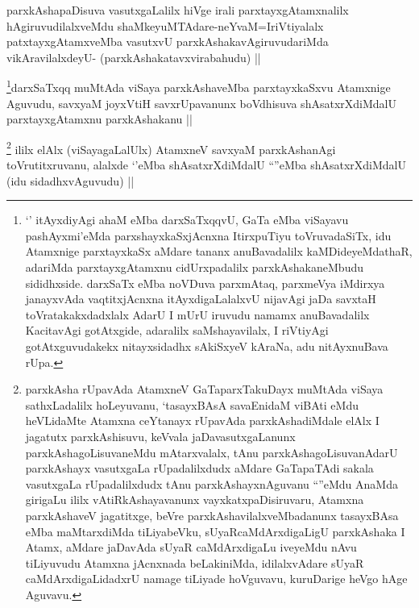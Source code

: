 
\begin{artha}
parxkAshapaDisuva vasutxgaLalilx hiVge irali parxtayxgAtamxnalilx hAgiruvudilalxveMdu shaMkeyuMTAdare-neYvaM=IriVtiyalalx patxtayxgAtamxveMba vasutxvU parxkAshakavAgiruvudariMda vikAravilalxdeyU- (parxkAshakatavxvirabahudu) ||
\end{artha}



\begin{artha}
  \footnote{`\stext' itAyxdiyAgi ahaM eMba darxSaTxqqvU, GaTa eMba viSayavu pashAyxmi'eMda parxshayxkaSxjAcnxna ItirxpuTiyu toVruvadaSiTx, idu Atamxnige parxtayxkaSx aMdare tananx anuBavadalilx kaMDideyeMdathaR, adariMda parxtayxgAtamxnu cidUrxpadalilx parxkAshakaneMbudu sididhxside. darxSaTx eMba noVDuva parxmAtaq, parxmeVya iMdirxya janayxvAda vaqtitxjAcnxna itAyxdigaLalalxvU nijavAgi jaDa savxtaH toVratakakxdadxlalx AdarU I mUrU iruvudu namamx anuBavadalilx KacitavAgi gotAtxgide, adaralilx saMshayavilalx, I riVtiyAgi gotAtxguvudakekx nitayxsidadhx sAkiSxyeV kAraNa, adu nitAyxnuBava rUpa.}darxSaTxqq muMtAda viSaya parxkAshaveMba parxtayxkaSxvu Atamxnige Aguvudu, savxyaM joyxVtiH savxrUpavanunx boVdhisuva shAsatxrXdiMdalU parxtayxgAtamxnu parxkAshakanu ||
\end{artha}


\begin{artha}
\footnote{parxkAsha rUpavAda AtamxneV GaTaparxTakuDayx muMtAda viSaya sathxLadalilx hoLeyuvanu, `tasayxBAsA savaEnidaM viBAti eMdu heVLidaMte Atamxna ceYtanayx rUpavAda parxkAshadiMdale elAlx I jagatutx parxkAshisuvu, keVvala jaDavasutxgaLanunx parxkAshagoLisuvaneMdu mAtarxvalalx, tAnu parxkAshagoLisuvanAdarU parxkAshayx vasutxgaLa rUpadalilxdudx aMdare GaTapaTAdi sakala vasutxgaLa rUpadalilxdudx tAnu parxkAshayxnAguvanu ``\stext''eMdu AnaMda girigaLu ililx vAtiRkAshayavanunx vayxkatxpaDisiruvaru, Atamxna parxkAshaveV jagatitxge, beVre parxkAshavilalxveMbadanunx tasayxBAsa eMba maMtarxdiMda tiLiyabeVku, sUyaRcaMdArxdigaLigU parxkAshaka I Atamx, aMdare jaDavAda sUyaR caMdArxdigaLu iveyeMdu nAvu tiLiyuvudu Atamxna jAcnxnada beLakiniMda, idilalxvAdare sUyaR caMdArxdigaLidadxrU namage tiLiyade hoVguvavu, kuruDarige heVgo hAge Aguvavu.}
ililx elAlx (viSayagaLalUlx) AtamxneV savxyaM parxkAshanAgi toVrutitxruvanu, alalxde `\stext'eMba shAsatxrXdiMdalU ``\stext''eMba shAsatxrXdiMdalU (idu sidadhxvAguvudu) ||
\end{artha}

